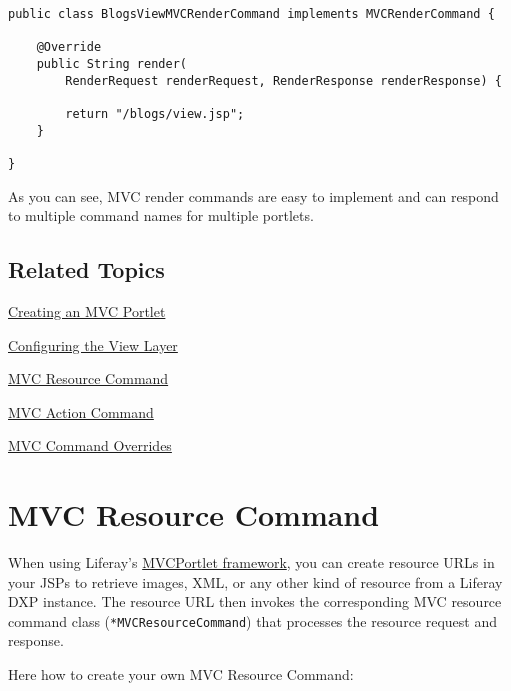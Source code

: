 \begin{enumerate}
\begin{verbatim}
public class BlogsViewMVCRenderCommand implements MVCRenderCommand {

    @Override
    public String render(
        RenderRequest renderRequest, RenderResponse renderResponse) {

        return "/blogs/view.jsp";
    }

}
\end{verbatim}
\end{enumerate}

As you can see, MVC render commands are easy to implement and can
respond to multiple command names for multiple portlets.

\section{Related Topics}\label{related-topics-7}

\href{/docs/7-2/appdev/-/knowledge_base/a/creating-an-mvc-portlet}{Creating
an MVC Portlet}

\href{/docs/7-2/appdev/-/knowledge_base/a/configuring-the-view-layer}{Configuring
the View Layer}

\href{/docs/7-2/appdev/-/knowledge_base/a/mvc-resource-command}{MVC
Resource Command}

\href{/docs/7-2/appdev/-/knowledge_base/a/mvc-action-command}{MVC Action
Command}

\href{/docs/7-2/customization/-/knowledge_base/c/overriding-liferay-mvc-commands}{MVC
Command Overrides}

\chapter{MVC Resource Command}\label{mvc-resource-command}

When using Liferay's
\href{/docs/7-2/appdev/-/knowledge_base/a/liferay-mvc-portlet}{MVCPortlet
framework}, you can create resource URLs in your JSPs to retrieve
images, XML, or any other kind of resource from a Liferay DXP instance.
The resource URL then invokes the corresponding MVC resource command
class (\texttt{*MVCResourceCommand}) that processes the resource request
and response.

Here how to create your own MVC Resource Command:

